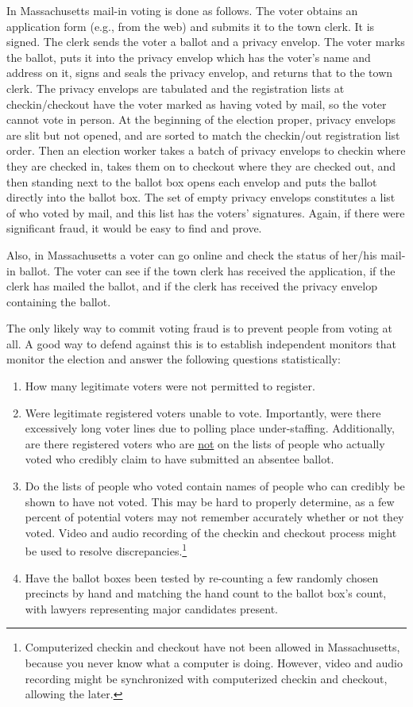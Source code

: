 \documentclass[12pt]{article}
\begin{document}
In Massachusetts mail-in voting is done as follows.  The voter
obtains an application form (e.g., from the web) and submits it to the
town clerk.  It is signed.  The clerk sends the voter a ballot
and a privacy envelop.  The voter marks the ballot, puts it
into the privacy envelop which has the voter's name and address
on it, signs and seals the privacy envelop, and returns that to the town
clerk.  The privacy envelops are tabulated and the registration
lists at checkin/checkout have the voter marked as having
voted by mail, so the voter cannot vote in person.  At the
beginning of the election proper, privacy envelops are slit
but not opened, and are sorted to match the checkin/out registration
list order.  Then an election worker takes a batch of privacy envelops
to checkin where they are checked in, takes them on to checkout
where they are checked out, and then standing next to the ballot
box opens each envelop and puts the ballot directly into the
ballot box.
The set of empty privacy envelops constitutes a list of who voted
by mail, and this list has the voters' signatures.
Again, if there were significant fraud, it would be
easy to find and prove.

Also, in Massachusetts a voter can go online and check the
status of her/his mail-in ballot.  The voter can see if
the town clerk has received the application, if the clerk has
mailed the ballot, and if the clerk has received the privacy
envelop containing the ballot.

The only likely way to commit voting fraud is to prevent people from
voting at all.  A good way to defend against this is to establish
independent monitors that monitor the election and answer the following
questions statistically:
\begin{enumerate}
\item How many legitimate voters were not permitted to register.
\item Were legitimate registered voters unable to vote.  Importantly,
were there excessively long voter lines due to polling place
under-staffing.  Additionally,
are there registered voters who are \underline{not} on the lists
of people who actually voted who credibly claim to have submitted an
absentee ballot.
\item
Do the lists of people who voted contain names of people who
can credibly be shown to have not voted.  This may be hard to
properly determine, as a few percent of potential voters
may not remember accurately whether or not they voted.  Video
and audio recording of the checkin and checkout process might
be used to resolve discrepancies.\footnote{Computerized checkin and
checkout have not been allowed in Massachusetts, because you never
know what a computer is doing.  However, video and audio recording
might be synchronized with computerized checkin and checkout, allowing
the later.}
\item Have the ballot boxes been tested by re-counting a few
randomly chosen precincts by hand and matching the hand count
to the ballot box's count, with lawyers representing major candidates
present.
\end{enumerate}
\end{document}
